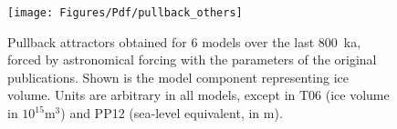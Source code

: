 \begin{figure}
\begin{center}
\texttt{[image: Figures/Pdf/pullback\_others]}
\end{center}
\caption
{
Pullback attractors obtained for 6 models over the last 800~ka, forced by astronomical forcing with the parameters of the original publications. Shown is the model component representing ice volume. Units are arbitrary in all models, except in T06 (ice volume in $10^{15}\mathrm{m}^{3}$) and PP12 (sea-level equivalent, in $\mathrm{m}$). %
}
\label{fig:pullback_others}
\end{figure}
